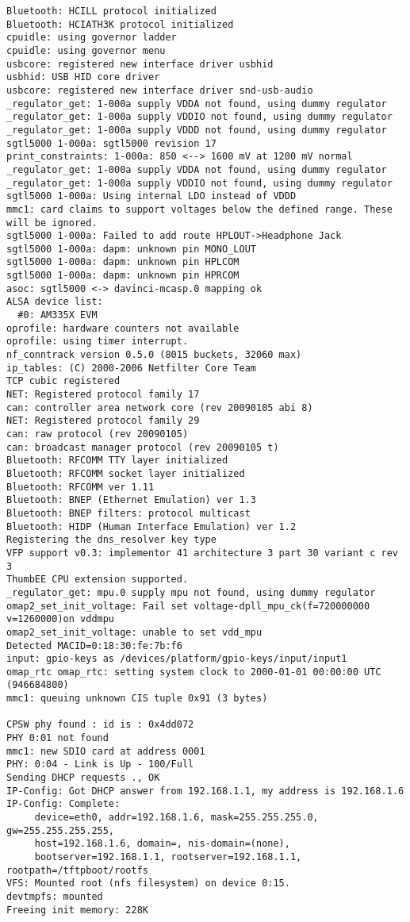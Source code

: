 \documentclass[a4paper,12pt]{report}
\begin{document}
\begin{lstlisting}[caption=Messages de sortie du terminal entre l'allumage de la cible et le prompt de login, label=message_sortie]
Bluetooth: HCILL protocol initialized
Bluetooth: HCIATH3K protocol initialized
cpuidle: using governor ladder
cpuidle: using governor menu
usbcore: registered new interface driver usbhid
usbhid: USB HID core driver
usbcore: registered new interface driver snd-usb-audio
_regulator_get: 1-000a supply VDDA not found, using dummy regulator
_regulator_get: 1-000a supply VDDIO not found, using dummy regulator
_regulator_get: 1-000a supply VDDD not found, using dummy regulator
sgtl5000 1-000a: sgtl5000 revision 17
print_constraints: 1-000a: 850 <--> 1600 mV at 1200 mV normal 
_regulator_get: 1-000a supply VDDA not found, using dummy regulator
_regulator_get: 1-000a supply VDDIO not found, using dummy regulator
sgtl5000 1-000a: Using internal LDO instead of VDDD
mmc1: card claims to support voltages below the defined range. These will be ignored.
sgtl5000 1-000a: Failed to add route HPLOUT->Headphone Jack
sgtl5000 1-000a: dapm: unknown pin MONO_LOUT
sgtl5000 1-000a: dapm: unknown pin HPLCOM
sgtl5000 1-000a: dapm: unknown pin HPRCOM
asoc: sgtl5000 <-> davinci-mcasp.0 mapping ok
ALSA device list:
  #0: AM335X EVM
oprofile: hardware counters not available
oprofile: using timer interrupt.
nf_conntrack version 0.5.0 (8015 buckets, 32060 max)
ip_tables: (C) 2000-2006 Netfilter Core Team
TCP cubic registered
NET: Registered protocol family 17
can: controller area network core (rev 20090105 abi 8)
NET: Registered protocol family 29
can: raw protocol (rev 20090105)
can: broadcast manager protocol (rev 20090105 t)
Bluetooth: RFCOMM TTY layer initialized
Bluetooth: RFCOMM socket layer initialized
Bluetooth: RFCOMM ver 1.11
Bluetooth: BNEP (Ethernet Emulation) ver 1.3
Bluetooth: BNEP filters: protocol multicast
Bluetooth: HIDP (Human Interface Emulation) ver 1.2
Registering the dns_resolver key type
VFP support v0.3: implementor 41 architecture 3 part 30 variant c rev 3
ThumbEE CPU extension supported.
_regulator_get: mpu.0 supply mpu not found, using dummy regulator
omap2_set_init_voltage: Fail set voltage-dpll_mpu_ck(f=720000000 v=1260000)on vddmpu
omap2_set_init_voltage: unable to set vdd_mpu
Detected MACID=0:18:30:fe:7b:f6
input: gpio-keys as /devices/platform/gpio-keys/input/input1
omap_rtc omap_rtc: setting system clock to 2000-01-01 00:00:00 UTC (946684800)
mmc1: queuing unknown CIS tuple 0x91 (3 bytes)

CPSW phy found : id is : 0x4dd072
PHY 0:01 not found
mmc1: new SDIO card at address 0001
PHY: 0:04 - Link is Up - 100/Full
Sending DHCP requests ., OK
IP-Config: Got DHCP answer from 192.168.1.1, my address is 192.168.1.6
IP-Config: Complete:
     device=eth0, addr=192.168.1.6, mask=255.255.255.0, gw=255.255.255.255,
     host=192.168.1.6, domain=, nis-domain=(none),
     bootserver=192.168.1.1, rootserver=192.168.1.1, rootpath=/tftpboot/rootfs
VFS: Mounted root (nfs filesystem) on device 0:15.
devtmpfs: mounted
Freeing init memory: 228K


\end{lstlisting}
\end{document}
